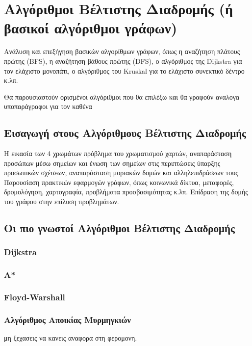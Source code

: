 \section{Αλγόριθμοι Βέλτιστης Διαδρομής (ή βασικοί αλγόριθμοι γράφων)}

Ανάλυση και επεξήγηση βασικών αλγορίθμων γράφων, όπως η αναζήτηση πλάτους πρώτης (BFS), η αναζήτηση βάθους πρώτης (DFS), ο αλγόριθμος της Dijkstra για τον ελάχιστο μονοπάτι, ο αλγόριθμος του Kruskal για το ελάχιστο συνεκτικό δέντρο κ.λπ.

Θα παρουσιαστούν ορισμένοι αλγόριθμοι που θα επιλέξω και θα γραφούν αναλογα υποπαράγραφοι για τον καθένα

\subsection{Εισαγωγή στους Αλγόριθμους Βέλτιστης Διαδρομής} 
Η εικασία των 4 χρωμάτων πρόβλημα του χρωματισμού χαρτών, αναπαράσταση προσώπων μέσω σημείων και ένωση των σημείων στις περιπτώσεις ύπαρξης προσωπικών σχέσεων, αναπαράσταση μοριακών δομών και αλληλεπιδράσεων τους
Παρουσίαση πρακτικών εφαρμογών γράφων, όπως κοινωνικά δίκτυα, μεταφορές, δρομολόγηση, χαρτογραφία, προβλήματα προσβασιμότητας κ.λπ. Επίδραση της δομής του γράφου στην επίλυση προβλημάτων.

\subsection{Οι πιο γνωστοί Αλγόριθμοι Βέλτιστης Διαδρομής}
\subsubsection{Dijkstra}
\subsubsection{A*}
\subsubsection{Floyd-Warshall}
\subsubsection{Αλγόριθμος Αποικίας Μυρμηγκιών}
μη ξεχασεις να κανεις αναφορα στη φερομονη.

